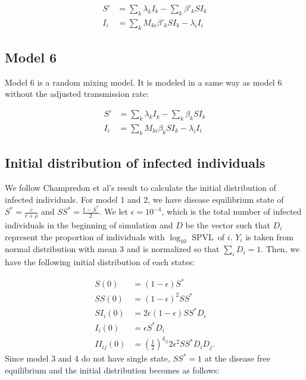 \documentclass[10pt,letterpaper]{article}
\newcommand{\khalf}{\left(\frac{1}{2}\right)^{\delta_{ij}}}  %
\newcommand{\Lspvl}{$\log_{10}$ SPVL}
\begin{document}
\begin{equation}
\begin{aligned}
S' & = \sum_k \lambda_k I_k - \sum_k \beta'_k S I_k\\
I_i & = \sum_k M_{ki} \beta'_k S I_k - \lambda_i I_i
\end{aligned}
\end{equation}

\subsection*{Model 6}

Model 6 is a random mixing model. It is modeled in a same way as model 6 without the adjusted transmission rate:

\begin{equation}
\begin{aligned}
S' & = \sum_k \lambda_k I_k - \sum_k \beta_k S I_k\\
I_i & = \sum_k M_{ki} \beta_k S I_k - \lambda_i I_i
\end{aligned}
\end{equation}


\subsection*{Initial distribution of infected individuals}

We follow Champredon et al's result to calculate the initial distribution of infected individuals. For model 1 and 2, we have disease equilibrium state of $S^* = \frac{c}{c + \rho}$ and $SS^* = \frac{1-S^*}{2}$. We let $\epsilon = 10^{-4}$, which is the total number of infected individuals in the beginning of simulation and $D$ be the vector such that $D_i$ represent the proportion of individuals with \Lspvl\ of $i$. $Y_i$ is taken from normal distribution with mean 3 and is normalized so that $\sum_i D_i = 1$. Then, we have the following initial distribution of each states:

\begin{equation}
\begin{aligned}
S(0) &= (1 - \epsilon) S^* \\
SS(0) &= (1 - \epsilon)^2 SS^*\\
SI_i(0) &= 2 \epsilon (1-\epsilon) SS^* D_i\\
I_i(0) &=  \epsilon S^* D_i\\
II_{ij}(0) &=  \khalf 2\epsilon^2 SS^* D_i D_j.
\end{aligned}
\end{equation}
Since model 3 and 4 do not have single state, $SS^*=1$ at the disease free equilibrium and the initial distribution becomes as follows:
\end{document}
